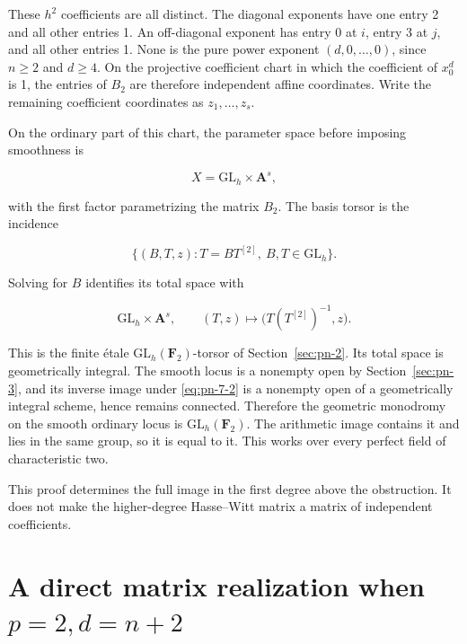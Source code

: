 \documentclass[11pt]{article}
\begin{document}
These \(h^2\) coefficients are all distinct. The diagonal exponents have
one entry 2 and all other entries 1. An off-diagonal exponent has entry
0 at \(i\), entry 3 at \(j\), and all other entries 1. None is the pure
power exponent \((d,0,\ldots,0)\), since \(n\geq2\) and \(d\geq4\).
On the projective coefficient chart in which the coefficient of \(x_0^d\)
is 1, the entries of \(B_2\) are therefore independent affine coordinates.
Write the remaining coefficient coordinates as \(z_1,\ldots,z_s\).

On the ordinary part of this chart, the parameter space before imposing
smoothness is

\begin{equation}
              X=\mathrm{GL}_h\times\mathbf A^s,
\end{equation}

with the first factor parametrizing the matrix \(B_2\).
The basis torsor is the incidence

\begin{equation}
       \{(B,T,z):T=BT^{[2]},\ B,T\in\mathrm{GL}_h\}.
\end{equation}

Solving for \(B\) identifies its total space with

\begin{equation}
 \mathrm{GL}_h\times\mathbf A^s,
 \qquad (T,z)\longmapsto\bigl(T(T^{[2]})^{-1},z\bigr).                 \label{eq:pn-7-2}
\end{equation}

This is the finite étale \(\mathrm{GL}_h(\mathbf F_2)\)-torsor of Section~\ref{sec:pn-2}.
Its total space is geometrically integral. The smooth locus is a nonempty
open by Section~\ref{sec:pn-3}, and its inverse image under \eqref{eq:pn-7-2} is a nonempty open
of a geometrically integral scheme, hence remains connected. Therefore
the geometric monodromy on the smooth ordinary locus is
\(\mathrm{GL}_h(\mathbf F_2)\). The arithmetic image contains it and lies
in the same group, so it is equal to it. This works over every perfect
field of characteristic two.

This proof determines the full image in the first degree above the obstruction. It does not make the higher-degree Hasse--Witt matrix a matrix of independent
coefficients.

\section{A direct matrix realization when \(p=2,d=n+2\)}\label{sec:pn-8}
\end{document}
